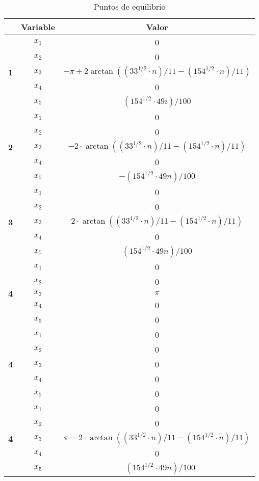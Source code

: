 \documentclass{ieeeaccess}
\begin{document}
\begin{table}[h!]
  \centering
  \caption{Puntos de equilibrio}\label{tab: ptoseq}
  \begin{tabular}{|c|c|c|}
    \hline
    \textbf{} & \textbf{Variable} & \textbf{Valor}\\
    \hline
    \multirow{5}{*}{\textbf{1}} & $x_1$ & 0\\
    & $x_2$ & 0\\
    & $x_3$ & $- \pi + 2\arctan((33^{1/2}\cdot n)/11 - (154^{1/2}\cdot n)/11)$\\
    & $x_4$ & 0\\
    & $x_5$ & $(154^{1/2}\cdot 49i)/100$\\
    \hline
    \multirow{5}{*}{\textbf{2}} & $x_1$ & 0\\
    & $x_2$ & 0\\
    & $x_3$ & $-2\cdot\arctan((33^{1/2}\cdot n)/11 - (154^{1/2}\cdot n)/11)$\\
    & $x_4$ & 0\\
    & $x_5$ & $-(154^{1/2}\cdot 49n)/100$\\
    \hline
    \multirow{5}{*}{\textbf{3}} & $x_1$ & 0\\
    & $x_2$ & 0\\
    & $x_3$ & $2\cdot\arctan((33^{1/2}\cdot n)/11 - (154^{1/2}\cdot n)/11)$\\
    & $x_4$ & 0\\
    & $x_5$ & $(154^{1/2}\cdot 49n)/100$\\
    \hline
    \multirow{5}{*}{\textbf{4}} & $x_1$ & 0\\
    & $x_2$ & 0\\
    & $x_3$ & $\pi$\\
    & $x_4$ & 0\\
    & $x_5$ & 0\\
    \hline
    \multirow{5}{*}{\textbf{4}} & $x_1$ & 0\\
    & $x_2$ & 0\\
    & $x_3$ & 0\\
    & $x_4$ & 0\\
    & $x_5$ & 0\\
    \hline
    \multirow{5}{*}{\textbf{4}} & $x_1$ & 0\\
    & $x_2$ & 0\\
    & $x_3$ & $\pi - 2\cdot\arctan((33^{1/2}\cdot n)/11
              - (154^{1/2}\cdot n)/11)$\\
    & $x_4$ & 0\\
    & $x_5$ & $-(154^{1/2}\cdot 49n)/100$\\
    \hline
\end{tabular}
\end{table}
\end{document}
